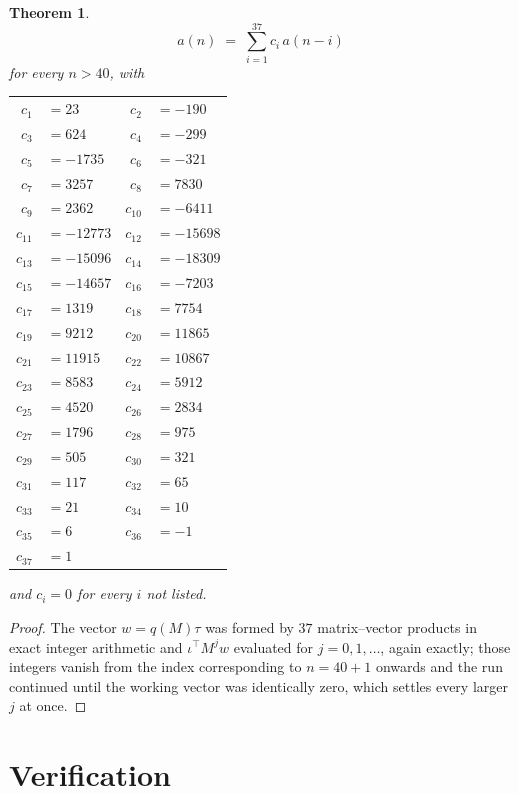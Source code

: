 \documentclass[11pt,a4paper]{article}
\theoremstyle{plain}
\newtheorem{theorem}{Theorem}
\theoremstyle{definition}
\begin{document}
\begin{theorem}
\[
a(n)\;=\;\sum_{i=1}^{37}c_i\,a(n-i)
\]
for every $n>40$, with
\begin{center}\footnotesize
\begin{tabular}{r@{\,}l@{\qquad}r@{\,}l}
$c_{1}$ & $=23$ & $c_{2}$ & $=-190$ \\
$c_{3}$ & $=624$ & $c_{4}$ & $=-299$ \\
$c_{5}$ & $=-1735$ & $c_{6}$ & $=-321$ \\
$c_{7}$ & $=3257$ & $c_{8}$ & $=7830$ \\
$c_{9}$ & $=2362$ & $c_{10}$ & $=-6411$ \\
$c_{11}$ & $=-12773$ & $c_{12}$ & $=-15698$ \\
$c_{13}$ & $=-15096$ & $c_{14}$ & $=-18309$ \\
$c_{15}$ & $=-14657$ & $c_{16}$ & $=-7203$ \\
$c_{17}$ & $=1319$ & $c_{18}$ & $=7754$ \\
$c_{19}$ & $=9212$ & $c_{20}$ & $=11865$ \\
$c_{21}$ & $=11915$ & $c_{22}$ & $=10867$ \\
$c_{23}$ & $=8583$ & $c_{24}$ & $=5912$ \\
$c_{25}$ & $=4520$ & $c_{26}$ & $=2834$ \\
$c_{27}$ & $=1796$ & $c_{28}$ & $=975$ \\
$c_{29}$ & $=505$ & $c_{30}$ & $=321$ \\
$c_{31}$ & $=117$ & $c_{32}$ & $=65$ \\
$c_{33}$ & $=21$ & $c_{34}$ & $=10$ \\
$c_{35}$ & $=6$ & $c_{36}$ & $=-1$ \\
$c_{37}$ & $=1$ \\
\end{tabular}
\end{center}
and $c_i=0$ for every $i$ not listed.
\end{theorem}

\begin{proof}
The vector $w=q(M)\tau$ was formed by $37$ matrix--vector products in exact integer
arithmetic and $\iota^{\!\top}M^{j}w$ evaluated for $j=0,1,\dots$, again exactly; those
integers vanish from the index corresponding to $n=40+1$ onwards and the run continued
until the working vector was identically zero, which settles every larger $j$ at once.
\end{proof}

\section{Verification}
\end{document}
